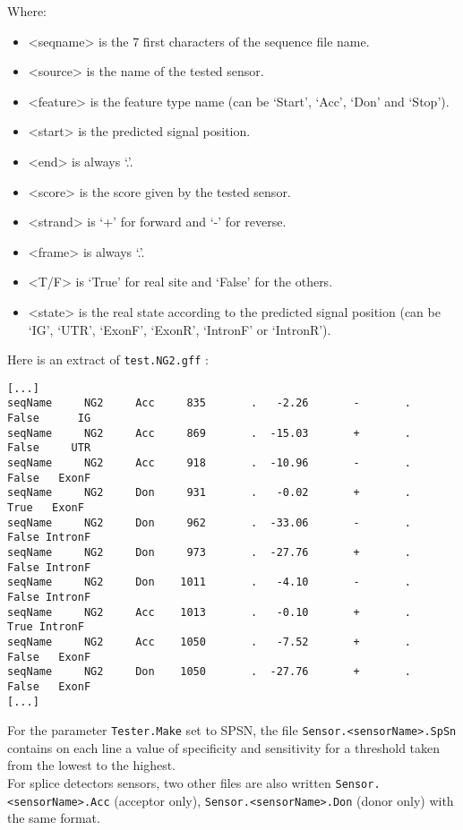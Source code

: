 Where:
\begin{itemize}
\item <seqname> is the 7 first characters of the sequence file name.
\item <source> is the name of the tested sensor.
\item <feature> is the feature type name (can be `Start', `Acc', `Don' and
`Stop').
\item <start> is the predicted signal position.
\item <end> is always `.'.
\item <score> is the score given by the tested sensor.
\item <strand> is `+' for forward and `-' for reverse.
\item <frame> is always `.'.
\item <T/F> is `True' for real site and `False' for the others.
\item <state> is the real state according to the predicted signal
  position (can
  be `IG', `UTR', `ExonF', `ExonR', `IntronF' or `IntronR').
\end{itemize}
Here is an extract of \texttt{test.NG2.gff} :
\begin{Verbatim}[fontsize=\small]
[...]
seqName     NG2     Acc     835       .   -2.26       -       .   False      IG
seqName     NG2     Acc     869       .  -15.03       +       .   False     UTR
seqName     NG2     Acc     918       .  -10.96       -       .   False   ExonF
seqName     NG2     Don     931       .   -0.02       +       .    True   ExonF
seqName     NG2     Don     962       .  -33.06       -       .   False IntronF
seqName     NG2     Don     973       .  -27.76       +       .   False IntronF
seqName     NG2     Don    1011       .   -4.10       -       .   False IntronF
seqName     NG2     Acc    1013       .   -0.10       +       .    True IntronF
seqName     NG2     Acc    1050       .   -7.52       +       .   False   ExonF
seqName     NG2     Don    1050       .  -27.76       +       .   False   ExonF
[...]
\end{Verbatim}

For the parameter \texttt{Tester.Make} set to SPSN, the file \texttt{Sensor.<sensorName>.SpSn} contains on each line a value of specificity and sensitivity for a threshold 
taken from the lowest to the highest.\\ 
For splice detectors sensors, two other files are also written \texttt{Sensor.<sensorName>.Acc} (acceptor only), \texttt{Sensor.<sensorName>.Don} (donor only) with the same format.


